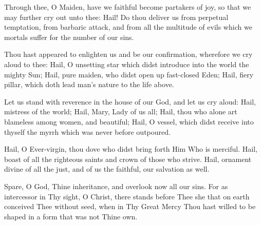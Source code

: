 \documentclass[twoside, letterpaper, 12pt]{report}
\begin{document}



Through thee, O Maiden, have we faithful become partakers of joy,
so that we may further cry out unto thee:
Hail! Do thou deliver us from perpetual temptation, from barbaric attack,
and from all the multitude of evils which we mortals suffer
for the number of our sins.


Thou hast appeared to enlighten us and be our confirmation,
wherefore we cry aloud to thee:
Hail, O unsetting star which didst introduce into the world the mighty Sun;
Hail, pure maiden, who didst open up fast-closed Eden;
Hail, fiery pillar, which doth lead man’s nature to the life above.


Let us stand with reverence in the house of our God, and let us cry aloud:
Hail, mistress of the world;
Hail, Mary, Lady of us all;
Hail, thou who alone art blameless among women, and beautiful;
Hail, O vessel, which didst receive into thyself the myrrh
which was never before outpoured.


Hail, O Ever-virgin, thou dove who didst bring forth Him Who is merciful.
Hail, boast of all the righteous saints and crown of those who strive.
Hail, ornament divine of all the just, and of us the faithful,
our salvation as well.


Spare, O God, Thine inheritance, and overlook now all our sins.
For as intercessor in Thy sight, O Christ,
there stands before Thee she that on earth conceived Thee without seed,
when in Thy Great Mercy
Thou hast willed to be shaped in a form that was not Thine own.


\end{document}

